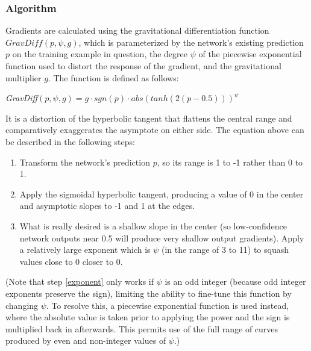 \documentclass[10pt]{article}
\begin{document}
\subsubsection{Algorithm}

Gradients are calculated using the gravitational differentiation function $GravDiff(p, \psi, g)$, which is parameterized by the network's existing prediction $p$ on the training example in question, the degree $\psi$ of the piecewise exponential function used to distort the response of the gradient, and the gravitational multiplier $g$. The function is defined as follows:

{\it GravDiff}$(p, \psi, g) = g \cdot sgn(p) \cdot abs(tanh(2(p - 0.5))) ^ \psi$

It is a distortion of the hyperbolic tangent that flattens the central range and comparatively exaggerates the asymptote on either side. The equation above can be described in the following steps:

\begin{enumerate}
    \item Transform the network's prediction $p$, so its range is 1 to -1 rather than 0 to 1.
    \item Apply the sigmoidal hyperbolic tangent, producing a value of 0 in the center and asymptotic slopes to -1 and 1 at the edges.
    \item \label{exponent} What is really desired is a shallow slope in the center (so low-confidence network outputs near 0.5 will produce very shallow output gradients). Apply a relatively large exponent which is $\psi$ (in the range of 3 to 11) to squash values close to 0 closer to 0.
\end{enumerate}

(Note that step \ref{exponent} only works if $\psi$ is an odd integer (because odd integer exponents preserve the sign), limiting the ability to fine-tune this function by changing $\psi$. To resolve this, a piecewise exponential function is used instead, where the absolute value is taken prior to applying the power and the sign is multiplied back in afterwards. This permits use of the full range of curves produced by even and non-integer values of $\psi$.)
\end{document}
